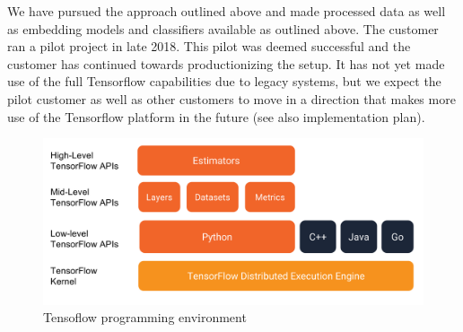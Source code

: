 \documentclass{article}
\begin{document}
We have pursued the approach outlined above and made processed data as well as embedding models and classifiers available as outlined above. The customer ran a pilot project in late 2018.  This pilot was deemed successful and the customer has continued towards productionizing the setup. It has not yet made use of the full Tensorflow capabilities due to legacy systems, but we expect the pilot customer as well as other customers to move in a direction that makes more use of the Tensorflow platform in the future (see also implementation plan).



\begin{figure}
\begin{center}
\includegraphics[width=\textwidth]{tensorflow_programming_environment}
\end{center}
\caption{Tensoflow programming environment}
\label{fig:tensorflow}
\end{figure}
\end{document}
